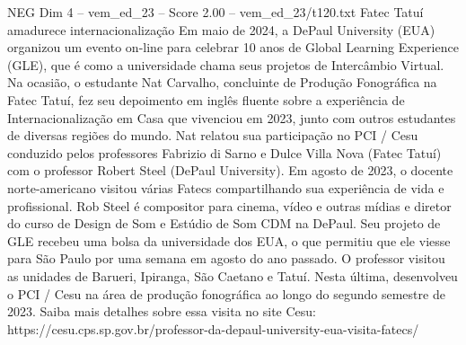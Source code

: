\begin{textsample}{NEG Dim 4 – vem\_ed\_23 – Score 2.00 – vem\_ed\_23/t120.txt}  \label{ex:f4_neg_090}
Fatec Tatuí amadurece internacionalização Em maio de 2024, a DePaul University (EUA) organizou um evento on-line para celebrar 10 anos de Global Learning Experience (GLE), que é como a universidade chama seus projetos de Intercâmbio Virtual.
Na ocasião, o estudante Nat Carvalho, concluinte de Produção Fonográfica na Fatec Tatuí, fez seu depoimento em inglês fluente sobre a experiência de Internacionalização em Casa que vivenciou em 2023, junto com outros estudantes de diversas regiões do mundo.
Nat relatou sua participação no PCI / Cesu conduzido pelos professores Fabrizio di Sarno e Dulce Villa Nova (Fatec Tatuí) com o professor Robert Steel (DePaul University).
Em agosto de 2023, o docente norte-americano visitou várias Fatecs compartilhando sua experiência de vida e profissional.
Rob Steel é compositor para cinema, vídeo e outras mídias e diretor do curso de Design de Som e Estúdio de Som CDM na DePaul.
Seu projeto de GLE recebeu uma bolsa da universidade dos EUA, o que permitiu que ele viesse para São Paulo por uma semana em agosto do ano passado.
O professor visitou as unidades de Barueri, Ipiranga, São Caetano e Tatuí.
Nesta última, desenvolveu o PCI / Cesu na área de produção fonográfica ao longo do segundo semestre de 2023.
Saiba mais detalhes sobre essa visita no site Cesu: https://cesu.cps.sp.gov.br/professor-da-depaul-university-eua-visita-fatecs/

\end{textsample}
